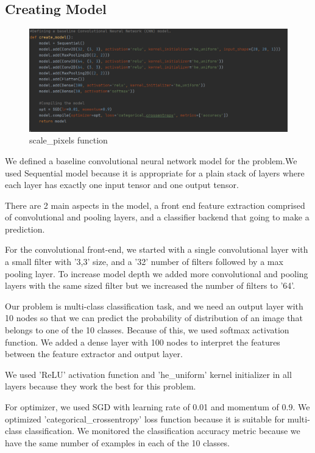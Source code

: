 \documentclass[onecolumn]{article}
\begin{document}
\clearpage
\subsection{Creating Model}

\begin{figure}[h!]
\centering
    \includegraphics[width=\linewidth]{model.PNG}
\caption{\label{}
scale\_pixels function}
\end{figure}

We defined a baseline convolutional neural network model for the problem.We used Sequential model because it is appropriate for a plain stack of layers where each layer has exactly one input tensor and one output tensor.

There are 2 main aspects in the model, a front end feature extraction  comprised of convolutional and pooling layers, and a classifier backend that going to make a prediction.

For the convolutional front-end, we started with a single convolutional layer with a small filter with '3,3' size, and a '32' number of filters followed by a max pooling layer. To increase model depth we added more convolutional and pooling layers with the same sized filter but we increased the number of filters to '64'.

Our problem is multi-class classification task, and we need an output layer with 10 nodes so that we can predict the probability of distribution of an image that belongs to one of the 10 classes. Because of this, we used softmax activation function. We added a dense layer with 100 nodes to interpret the features between the feature extractor and output layer.

We used 'ReLU' activation function and  'he\_uniform' kernel initializer in all layers because they work the best for this problem.

For optimizer, we used SGD with learning rate of 0.01 and momentum of 0.9. We optimized 'categorical\_crossentropy' loss function because it is suitable for multi-class classification. We monitored the classification accuracy metric because we have the same number of examples in each of the 10 classes.
\end{document}
